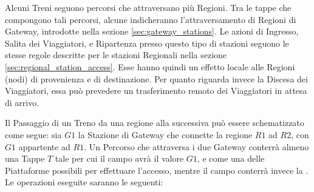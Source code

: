 	Alcuni Treni seguono percorsi che attraversano più Regioni. Tra le tappe che compongono tali percorsi, alcune indicheranno l'attraversamento di Regioni di Gateway, introdotte nella sezione \ref{sec:gateway_stations}. 
	Le azioni di Ingresso, Salita dei Viaggiatori, e Ripartenza presso questo tipo di stazioni seguono le stesse regole descritte per le stazioni Regionali nella sezione \ref{sec:regional_station_access}. Esse hanno quindi un effetto locale alle Regioni (nodi) di provenienza e di destinazione.
	Per quanto riguarda invece la Discesa dei Viaggiatori, essa può prevedere un trasferimento remoto dei Viaggiatori in attesa di arrivo.
	
	Il Passaggio di un Treno da una regione alla successiva può essere schematizzato come segue: sia $G1$ la Stazione di Gateway che connette la regione $R1$ ad $R2$, con $G1$ appartente ad $R1$. Un Percorso che attraversa i due Gateway conterrà almeno una Tappe $T$ tale per cui il campo  avrà il valore $G1$, e come  una delle Piattaforme possibili per effettuare l'accesso, mentre il campo  conterrà invece la .
	Le operazioni eseguite saranno le seguenti:
